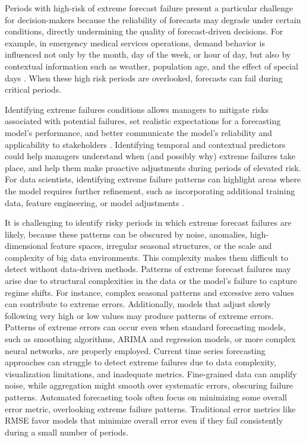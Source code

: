 \documentclass[]{interact}
\theoremstyle{plain}
\theoremstyle{definition}
\theoremstyle{remark}
\begin{document}
Periods with high-risk of extreme forecast failure present a particular challenge for
decision-makers because the reliability of forecasts may degrade under certain conditions,
directly undermining the quality of forecast-driven decisions. For example, in emergency
medical services operations, demand behavior is influenced not only by the month, day of the
week, or hour of day, but also by contextual information such as weather, population age,
and the effect of special days \citep{abreu2023}. When these high risk periods are
overlooked, forecasts can fail during critical periods.

Identifying extreme failures conditions allows managers to mitigate risks associated with
potential failures, set realistic expectations for a forecasting model's performance, and
better communicate the model's reliability and applicability to stakeholders
\citep{cakmak2024}. Identifying temporal and contextual predictors could help managers
understand when (and possibly why) extreme failures take place, and help them make
proactive adjustments during periods of elevated risk. For data scientists, identifying
extreme failure patterns can highlight areas where the model requires further refinement,
such as incorporating additional training data, feature engineering, or model adjustments
\citep{cakmak2024}.

It is challenging to identify risky periods in which extreme forecast failures are likely,
because these patterns can be obscured by noise, anomalies, high-dimensional feature spaces,
irregular seasonal structures, or the scale and complexity of big data environments. This
complexity makes them difficult to detect without data-driven methods. Patterns of extreme
forecast failures may arise due to structural complexities in the data or the model's failure
to capture regime shifts. For instance, complex seasonal patterns and excessive zero values
can contribute to extreme errors. Additionally, models that adjust slowly following very high
or low values may produce patterns of extreme errors. Patterns of extreme errors can occur
even when standard forecasting models, such as smoothing algorithms, ARIMA and regression
models, or more complex neural networks, are properly employed. Current time series
forecasting approaches can struggle to detect extreme failures due to data complexity,
visualization limitations, and inadequate metrics. Fine-grained data can amplify noise,
while aggregation might smooth over systematic errors, obscuring failure patterns. Automated
forecasting tools often focus on minimizing some overall error metric, overlooking extreme
failure patterns. Traditional error metrics like RMSE favor models that minimize overall
error even if they fail consistently during a small number of periods.
\end{document}
